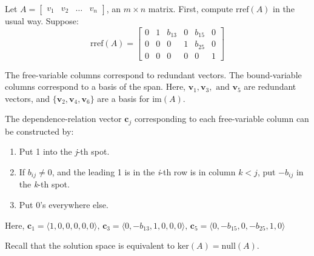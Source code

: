 \documentclass[../main.tex]{subfiles}
\begin{document}
Let \( A = \begin{bmatrix}
    v_1 & v_2 & \dots & v_n
\end{bmatrix} \), an \( m \times n \) matrix.
First, compute \( \text{rref}(A) \) in the usual way. Suppose:
\[ \text{rref}(A) = \begin{bmatrix}
    0 & 1 & b_{13} & 0 & b_{15} & 0 \\
    0 & 0 & 0 & 1 & b_{25} & 0 \\
    0 & 0 & 0 & 0 & 0 & 1
\end{bmatrix} \]

The free-variable columns correspond to redundant vectors. The bound-variable columns correspond to a basis of the span.
Here, \( \textbf{v}_1, \textbf{v}_3, \text{ and } \textbf{v}_5 \) are redundant vectors,
and \( \{ \textbf{v}_2, \textbf{v}_4, \textbf{v}_6 \} \) are a basis for \( \text{im}(A) \).

The dependence-relation vector \( \textbf{c}_j \) corresponding to each free-variable column can be constructed by:
\begin{enumerate}
    \item Put 1 into the \textit{j}-th spot.
    \item If \( b_{ij} \neq 0 \), and the leading 1 is in the \textit{i}-th row is in column \( k < j \),
        put \( -b_{ij} \) in the \textit{k}-th spot.
    \item Put 0's everywhere else.
\end{enumerate}
Here, \( \textbf{c}_1 = \langle 1,0,0,0,0,0 \rangle, \,
    \textbf{c}_3 = \langle 0, -b_{13}, 1, 0, 0, 0 \rangle, \,
    \textbf{c}_5 = \langle 0, -b_{15}, 0, -b_{25}, 1, 0 \rangle \)

Recall that the solution space is equivalent to \( \text{ker}(A) = \text{null}(A) \).
\end{document}
